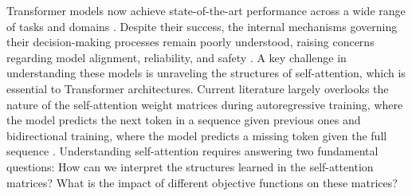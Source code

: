 Transformer models now achieve state-of-the-art performance across a wide range of tasks and domains \citep{radfordLanguageModelsAre2019, dosovitskiyImageWorth16x162021, radford_robust_2023}.
%
Despite their success, the internal mechanisms governing their decision-making processes remain poorly understood, raising concerns regarding model alignment, reliability, and safety \citep{wang_aligning_2023, yao_survey_2024}.
%
A key challenge in understanding these models is unraveling the structures of self-attention, which is essential to Transformer architectures.
%
Current literature largely overlooks the nature of the self-attention weight matrices during autoregressive training, where the model predicts the next token in a sequence given previous ones \citep{radfordLanguageModelsAre2019,blackGPTNeoLargeScale2021,touvronLLaMAOpenEfficient2023} and bidirectional training, where the model predicts a missing token given the full sequence \citep{devlinBERTPretrainingDeep2019, baoBEiTBERTPreTraining2022,warnerSmarterBetterFaster2024}.
%
Understanding self-attention requires answering two fundamental questions: 
%
%
%
%
%
%
%
How can we interpret the structures learned in the self-attention matrices? 
%
What is the impact of different objective functions on these matrices?
%
%

